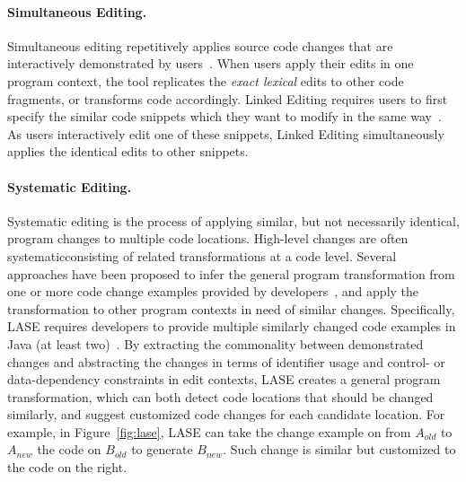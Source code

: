\paragraph{Simultaneous Editing.}
Simultaneous editing repetitively applies source code changes that are interactively demonstrated by users~\cite{MiM2001}. When users apply their edits in one program context, the tool replicates the \emph{exact lexical} edits to other code fragments, or transforms code accordingly. Linked Editing requires users to first specify the similar code snippets which they want to modify in the same way~\cite{TBG2004}. As users interactively edit one of these snippets, Linked Editing simultaneously applies the identical edits to other snippets. 

\paragraph{Systematic Editing.} 
Systematic editing is the process of applying similar, but not necessarily identical, program changes to multiple code locations. High-level changes are often systematic\textemdash consisting of related transformations at a code level. Several approaches have been proposed to infer the general program transformation from one or more code change examples provided by developers~\cite{MKM2011,Meng12:lase,Rolim:2017}, and apply the transformation to other program contexts in need of similar changes. Specifically, LASE requires developers to provide multiple similarly changed code examples in Java (at least two)~\cite{Meng12:lase}. By extracting the commonality between demonstrated changes and abstracting the changes in terms of identifier usage and control- or data-dependency constraints in edit contexts, LASE creates a general program transformation, which can both detect code locations that should be changed similarly, and suggest customized code changes for each candidate location. For example, in Figure~\ref{fig:lase}, LASE can take the change example on from $A_{old}$ to $A_{new}$ the code on $B_{old}$ to generate $B_{new}$. Such change is similar but customized to the code on the right. 

